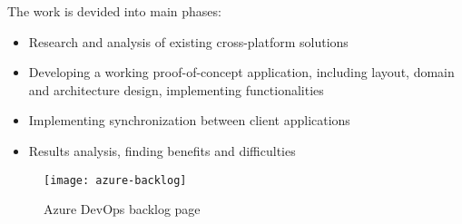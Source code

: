 The work is devided into main phases:

\begin{itemize}
    \item Research and analysis of existing cross-platform solutions
    \item Developing a working proof-of-concept application, including layout, domain and architecture design, implementing functionalities
    \item Implementing synchronization between client applications
    \item Results analysis, finding benefits and difficulties
\end{itemize}

\begin{figure}[H]
    \centering
    \texttt{[image: azure-backlog]}
    \caption[Azure DevOps backlog page]{\label{fig:azuredevops} Azure DevOps backlog page }
\end{figure}